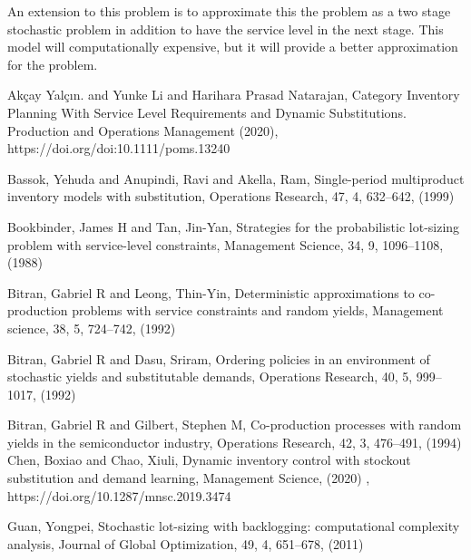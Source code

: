 \documentclass[10pt]{article}
\begin{document}
An extension to this problem is to approximate this the problem as a two stage stochastic problem in addition to have the service level in the next stage. This model will computationally expensive, but it will provide a better approximation for the problem.

\begin{thebibliography}{99}







Akçay Yalçın. and Yunke Li and Harihara Prasad Natarajan, Category Inventory Planning With
Service Level Requirements and Dynamic Substitutions.
Production and Operations Management (2020), https://doi.org/doi:10.1111/poms.13240

Bassok, Yehuda and Anupindi, Ravi and Akella, Ram,
Single-period multiproduct inventory models with substitution, Operations Research, 47, 4, 632--642, (1999)
 

 Bookbinder, James H and Tan, Jin-Yan, Strategies for the probabilistic lot-sizing problem with service-level constraints, Management Science, 34, 9, 1096--1108,
 (1988)


Bitran, Gabriel R and Leong, Thin-Yin, Deterministic approximations to co-production problems with service constraints and random yields, Management science, 38, 5, 724--742, (1992)
  
  
Bitran, Gabriel R and Dasu, Sriram, Ordering policies in an environment of stochastic yields and substitutable demands,
Operations Research,
40, 5,
999--1017, (1992)

Bitran, Gabriel R and Gilbert, Stephen M,
  Co-production processes with random yields in the semiconductor industry, Operations Research, 42, 3, 476--491, (1994)
Chen, Boxiao and Chao, Xiuli, Dynamic inventory control with stockout substitution and demand learning, Management Science, (2020) , https://doi.org/10.1287/mnsc.2019.3474


 Guan, Yongpei, Stochastic lot-sizing with backlogging: computational complexity analysis,  Journal of Global Optimization, 49, 4, 651--678, (2011)


\end{thebibliography}
\end{document}
